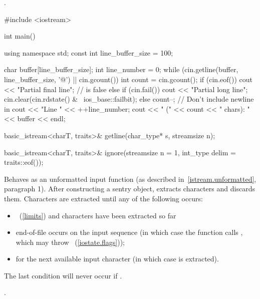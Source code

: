 \begin{itemdescr}
\pnum
\returns
{}.

\pnum
\begin{example}
\begin{codeblock}
#include <iostream>

int main() {
  using namespace std;
  const int line_buffer_size = 100;

  char buffer[line_buffer_size];
  int line_number = 0;
  while (cin.getline(buffer, line_buffer_size, '@\textbackslash@n') || cin.gcount()) {
    int count = cin.gcount();
    if (cin.eof())
      cout << "Partial final line";   //  is false
    else if (cin.fail()) {
      cout << "Partial long line";
      cin.clear(cin.rdstate() & ~ios_base::failbit);
    } else {
      count--;                        // Don't include newline in 
      cout << "Line " << ++line_number;
    }
    cout << " (" << count << " chars): " << buffer << endl;
  }
}
\end{codeblock}
\end{example}
\end{itemdescr}

%
\begin{itemdecl}
basic_istream<charT, traits>& getline(char_type* s, streamsize n);
\end{itemdecl}

\begin{itemdescr}
\pnum
\returns
{}
\end{itemdescr}

%
\begin{itemdecl}
basic_istream<charT, traits>&
    ignore(streamsize n = 1, int_type delim = traits::eof());
\end{itemdecl}

\begin{itemdescr}
\pnum
\effects
Behaves as an unformatted input function
(as described in~\ref{istream.unformatted}, paragraph 1).
After constructing a sentry object, extracts
characters and discards them.
Characters are extracted until any of the following occurs:
\begin{itemize}
\item
{}~(\ref{limits})
and
 characters have been extracted so far
\item
end-of-file occurs on the input sequence
(in which case the function calls
,
which may throw
~(\ref{iostate.flags}));
\item
{}
for the next available input character 
(in which case  is extracted).
\end{itemize}

\pnum
\remarks
The last condition will never occur if
.

\pnum
\returns
{}.
\end{itemdescr}

